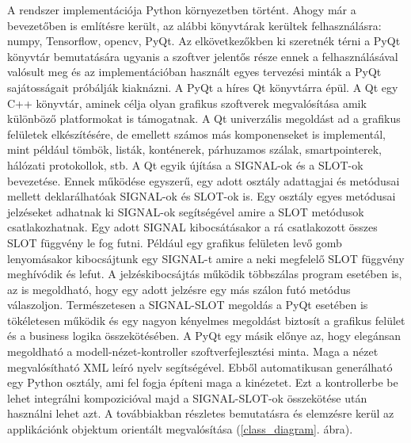 \documentclass[12pt, a4paper, oneside]{book}
\theoremstyle{tetel}
\begin{document}
A rendszer implementációja Python környezetben történt. Ahogy már a bevezetőben is említésre került, az alábbi könyvtárak kerültek felhasználásra: numpy, Tensorflow, opencv, PyQt. Az elkövetkezőkben ki szeretnék térni a PyQt könyvtár bemutatására ugyanis a szoftver jelentős része ennek a felhasználásával valósult meg és az implementációban használt egyes tervezési minták a PyQt sajátosságait próbálják kiaknázni.
\newline
\indent
A PyQt a híres Qt könyvtárra épül. A Qt egy C++ könyvtár, aminek célja olyan grafikus szoftverek megvalósítása amik különböző platformokat is támogatnak. A Qt univerzális megoldást ad a grafikus felületek elkészítésére, de emellett számos más komponenseket is implementál, mint például tömbök, listák, konténerek, párhuzamos szálak, smartpointerek, hálózati protokollok, stb. A Qt egyik újítása a SIGNAL-ok és a SLOT-ok bevezetése. Ennek működése egyszerű, egy adott osztály adattagjai és metódusai mellett deklarálhatóak SIGNAL-ok és SLOT-ok is. Egy osztály egyes metódusai jelzéseket adhatnak ki SIGNAL-ok segítségével amire a SLOT metódusok csatlakozhatnak. Egy adott SIGNAL kibocsátásakor a rá csatlakozott összes SLOT függvény le fog futni. Például egy grafikus felületen levő gomb lenyomásakor kibocsájtunk egy SIGNAL-t amire a neki megfelelő SLOT függvény meghívódik és lefut. A jelzéskibocsájtás működik többszálas program esetében is, az is megoldható, hogy egy adott jelzésre egy más szálon futó metódus válaszoljon. Természetesen a SIGNAL-SLOT megoldás a PyQt esetében is tökéletesen működik és egy nagyon kényelmes megoldást biztosít a grafikus felület és a business logika összekötésében.
\newline
\indent
A PyQt egy másik előnye az, hogy elegánsan megoldható a modell-nézet-kontroller szoftverfejlesztési minta. Maga a nézet megvalósítható XML leíró nyelv segítségével. Ebből automatikusan generálható egy Python osztály, ami fel fogja építeni maga a kinézetet. Ezt a kontrollerbe be lehet integrálni kompozicióval majd a SIGNAL-SLOT-ok összekötése után használni lehet azt. 
\newline
\indent
A továbbiakban részletes bemutatásra és elemzésre kerül az applikációnk objektum orientált megvalósítása (\ref{class_diagram}. ábra).
\end{document}
